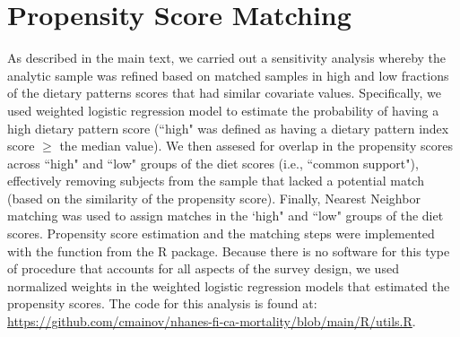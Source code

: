 \documentclass{article}
\begin{document}
\section{Propensity Score Matching}
\hspace{\parindent}As described in the main text, we carried out a sensitivity analysis whereby the analytic sample was refined based on matched samples in high and low fractions of the dietary patterns scores that had similar covariate values.\supercite{austin2009relative} Specifically, we used weighted logistic regression model to estimate the probability of having a high dietary pattern score (``high" was defined as having a dietary pattern index score $\ge$ the median value). We then assesed for overlap in the propensity scores across ``high" and ``low" groups of the diet scores  (i.e., ``common support"), effectively removing subjects from the sample that lacked a potential match (based on the similarity of the propensity score).\supercite{garrido2014methods} Finally, Nearest Neighbor matching was used to assign matches in the `high" and ``low" groups of the diet scores. \supercite{austin2014comparison} Propensity score estimation and the matching steps were implemented with the  {} function from the  {} R package.\supercite{matchitpackage} Because there is no software for this type of procedure that accounts for all aspects of the survey design, we used normalized weights in the weighted logistic regression models that estimated the propensity scores. The code for this analysis is found at: \textcolor{blue}{\url{https://github.com/cmainov/nhanes-fi-ca-mortality/blob/main/R/utils.R}}.


\printbibliography[title={References}]
\end{document}
